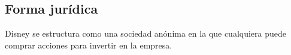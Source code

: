 \subsection{Forma jurídica}
Disney se estructura como una sociedad anónima en la que cualquiera puede comprar acciones para invertir en la empresa.
